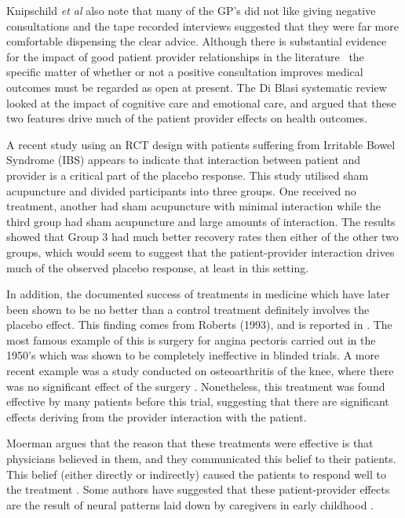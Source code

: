 Knipschild \textit{et al} also note that many of the GP's did not like giving negative consultations and the tape recorded interviews suggested that they were far more comfortable dispensing the clear advice.  Although there is substantial evidence for the impact of good patient provider relationships in the literature~\cite{blasi2001influence}  the specific matter of whether or not a positive consultation improves medical outcomes must be regarded as open at present. The Di Blasi systematic review \cite{Blasi2001} looked at the impact of cognitive care and emotional care, and argued that these two features drive much of the patient provider effects on health outcomes. 

A recent study \cite{Kaptchuk2008}  using an RCT design with patients suffering from Irritable Bowel Syndrome (IBS) appears to indicate that interaction between patient and provider is a critical part of the placebo response. This study utilised sham acupuncture and divided participants into three groups. One received no treatment, another had sham acupuncture with minimal interaction while the third group had sham acupuncture and large amounts of interaction. The results showed that Group 3 had much better recovery rates then either of the other two groups, which would seem to suggest that the patient-provider interaction drives much of the observed placebo response, at least in this setting.  

In addition, the documented success of treatments in medicine which have later been shown to be no better than a control treatment definitely involves the placebo effect. This finding comes from Roberts (1993), and is reported in \cite{Moerman2000a}.  The most famous example of this is surgery for angina pectoris carried out in the 1950's which was shown to be completely ineffective in blinded trials. A more recent example was a study conducted on osteoarthritis of the knee, where there was no significant effect of the surgery \cite{horng2002placebo}. Nonetheless, this treatment was found effective by many patients before this trial, suggesting that there are significant effects deriving from the provider interaction with the patient.  

Moerman argues that the reason that these treatments were effective is that physicians believed in them, and they communicated this belief to their patients. 
This belief (either directly or indirectly) caused the patients to respond well to the treatment \cite{Moerman2000}. Some authors have suggested that these patient-provider effects are the result of neural patterns laid down by caregivers in early childhood \cite{Kradin2004}.


